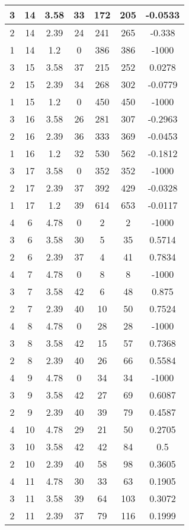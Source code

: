\documentclass[letterpaper, 12pt]{article}
\begin{document}
\begin{longtable}{|c|c|c|c|c|c|c|}
\hline
3 & 14 & 3.58 & 33 & 172 & 205 & -0.0533 \\
\hline
2 & 14 & 2.39 & 24 & 241 & 265 & -0.338 \\
\hline
1 & 14 & 1.2 & 0 & 386 & 386 & -1000 \\
\hline
3 & 15 & 3.58 & 37 & 215 & 252 & 0.0278 \\
\hline
2 & 15 & 2.39 & 34 & 268 & 302 & -0.0779 \\
\hline
1 & 15 & 1.2 & 0 & 450 & 450 & -1000 \\
\hline
3 & 16 & 3.58 & 26 & 281 & 307 & -0.2963 \\
\hline
2 & 16 & 2.39 & 36 & 333 & 369 & -0.0453 \\
\hline
1 & 16 & 1.2 & 32 & 530 & 562 & -0.1812 \\
\hline
3 & 17 & 3.58 & 0 & 352 & 352 & -1000 \\
\hline
2 & 17 & 2.39 & 37 & 392 & 429 & -0.0328 \\
\hline
1 & 17 & 1.2 & 39 & 614 & 653 & -0.0117 \\
\hline
4 & 6 & 4.78 & 0 & 2 & 2 & -1000 \\
\hline
3 & 6 & 3.58 & 30 & 5 & 35 & 0.5714 \\
\hline
2 & 6 & 2.39 & 37 & 4 & 41 & 0.7834 \\
\hline
4 & 7 & 4.78 & 0 & 8 & 8 & -1000 \\
\hline
3 & 7 & 3.58 & 42 & 6 & 48 & 0.875 \\
\hline
2 & 7 & 2.39 & 40 & 10 & 50 & 0.7524 \\
\hline
4 & 8 & 4.78 & 0 & 28 & 28 & -1000 \\
\hline
3 & 8 & 3.58 & 42 & 15 & 57 & 0.7368 \\
\hline
2 & 8 & 2.39 & 40 & 26 & 66 & 0.5584 \\
\hline
4 & 9 & 4.78 & 0 & 34 & 34 & -1000 \\
\hline
3 & 9 & 3.58 & 42 & 27 & 69 & 0.6087 \\
\hline
2 & 9 & 2.39 & 40 & 39 & 79 & 0.4587 \\
\hline
4 & 10 & 4.78 & 29 & 21 & 50 & 0.2705 \\
\hline
3 & 10 & 3.58 & 42 & 42 & 84 & 0.5 \\
\hline
2 & 10 & 2.39 & 40 & 58 & 98 & 0.3605 \\
\hline
4 & 11 & 4.78 & 30 & 33 & 63 & 0.1905 \\
\hline
3 & 11 & 3.58 & 39 & 64 & 103 & 0.3072 \\
\hline
2 & 11 & 2.39 & 37 & 79 & 116 & 0.1999 \\

\end{longtable}
\end{document}
